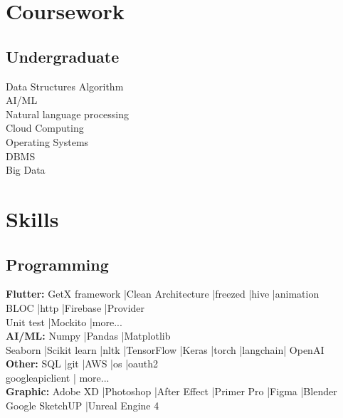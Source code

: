 \documentclass[]{resume}
\begin{document}
\begin{minipage}[t]{0.33\textwidth}
    \section{Coursework}
    \subsection{Undergraduate}
    Data Structures Algorithm\\
    AI/ML\\
    Natural language processing\\
    Cloud Computing\\
    Operating Systems\\
    DBMS\\
    Big Data\\
    \sectionsep


    \section{Skills}
    \subsection{Programming}
    \textbf{Flutter: }GetX framework |Clean
    Architecture |freezed |hive |animation\\BLOC |http |Firebase |Provider \\Unit test |Mockito |more...\\
    \textbf{AI/ML: }Numpy |Pandas |Matplotlib\\Seaborn |Scikit learn |nltk |TensorFlow |Keras |torch |langchain| OpenAI\\
    \textbf{Other: } SQL |git |AWS |os |oauth2\\googleapiclient | more...\\
    \textbf{Graphic: }Adobe XD |Photoshop |After Effect |Primer Pro |Figma |Blender\\Google SketchUP |Unreal Engine 4\\


\end{minipage}
\hfill
\end{document}
